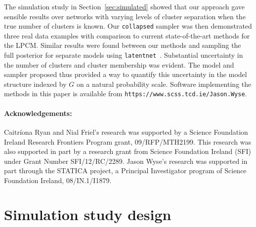 \documentclass[12pt]{article}
\begin{document}
The simulation study in Section~\ref{sec:simulated} showed that our approach gave sensible results over networks with varying levels of cluster separation when the true number of clusters is known. Our \texttt{collapsed} sampler was then demonstrated three real data examples with comparison to current state-of-the-art methods for the LPCM. Similar results were found between our methods and sampling the full posterior for separate models using \texttt{latentnet}~\cite{Kriv:Hand13}. Substantial uncertainty in the number of clusters and cluster membership was evident. The model and sampler proposed thus provided a way to quantify this uncertainty in the model structure indexed by $G$ on a natural probability scale. 
Software implementing the methods in this paper is available from \texttt{https://www.scss.tcd.ie/Jason.Wyse}.

\paragraph*{Acknowledgements:} Caitr\'{i}ona Ryan and Nial Friel's research was supported by a Science Foundation Ireland
Research Frontiers Program grant, 09/RFP/MTH2199. This research was also supported in part by a research grant from Science 
Foundation Ireland (SFI) under Grant Number SFI/12/RC/2289. Jason Wyse's research was supported in part through the STATICA project, a 
Principal Investigator program of Science Foundation Ireland, 08/IN.1/I1879.


\appendix

\section{Simulation study design} \label{sec:appendix}
\end{document}
